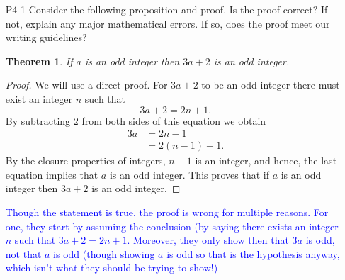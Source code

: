 \documentclass[10pt]{article}
\newcommand{\bs}{\begin{solution}}
\newtheorem{thm}{Theorem}
\begin{document}
\begin{itemize}
\newpage



\item [P4-1]  Consider the following proposition and proof. Is the proof correct? If not, explain any major mathematical errors. If so, does the proof meet our writing guidelines? 
	
		\begin{thm}
		If $a$ is an odd integer then $3a+2$ is an odd integer.
		\end{thm}
		\begin{proof}
		We will use a direct proof. For $3a+2$ to be an odd integer there must exist an integer $n$ such that
			\[3a+2 = 2n+1.\]
		By subtracting $2$ from both sides of this equation we obtain
			\begin{align*}
			3a &= 2n-1\\
			&=2(n-1)+1.
			\end{align*}
		By the closure properties of integers, $n-1$ is an integer, and hence, the last equation implies that $a$ is an odd integer. This proves that if $a$ is an odd integer then $3a+2$ is an odd integer.
		\end{proof}

\bs \textcolor{blue}{Though the statement is true, the proof is wrong for multiple reasons. For one, they start by assuming the conclusion (by saying there exists an integer $n$ such that $3a+2=2n+1$. Moreover, they only show then that $3a$ is odd, not that $a$ is odd (though showing $a$ is odd so that is the hypothesis anyway, which isn't what they should be trying to show!)} \end{solution}

\end{itemize}
	
\end{document}
